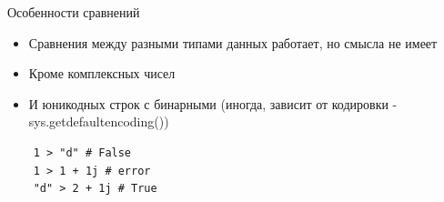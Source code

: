 \documentclass{article}
\begin{document}
\begin{center} Особенности сравнений \end{center}
\begin{itemize}
	\item Сравнения между разными типами данных работает, но смысла не имеет
	\item Кроме комплексных чисел
	\item И юникодных строк с бинарными 
			(иногда, зависит от кодировки - sys.getdefaultencoding())
\end{itemize}
\begin{lstlisting}
	1 > "d" # False
	1 > 1 + 1j # error
	"d" > 2 + 1j # True
\end{lstlisting}
\newpage

\end{document}
